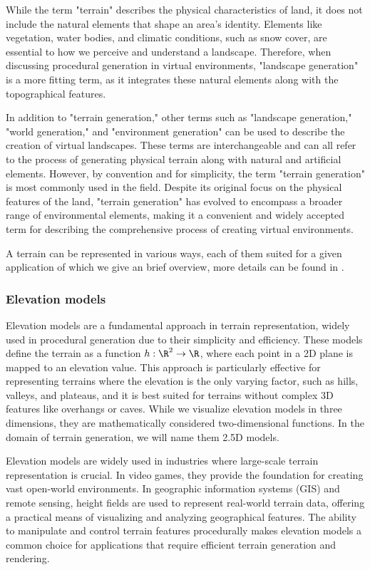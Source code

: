 While the term "terrain" describes the physical characteristics of land, it does not include the natural elements that shape an area's identity. Elements like vegetation, water bodies, and climatic conditions, such as snow cover, are essential to how we perceive and understand a landscape. Therefore, when discussing procedural generation in virtual environments, "landscape generation" is a more fitting term, as it integrates these natural elements along with the topographical features.

In addition to "terrain generation," other terms such as "landscape generation," "world generation," and "environment generation" can be used to describe the creation of virtual landscapes. These terms are interchangeable and can all refer to the process of generating physical terrain along with natural and artificial elements. However, by convention and for simplicity, the term "terrain generation" is most commonly used in the field. Despite its original focus on the physical features of the land, "terrain generation" has evolved to encompass a broader range of environmental elements, making it a convenient and widely accepted term for describing the comprehensive process of creating virtual environments.

A terrain can be represented in various ways, each of them suited for a given application of which we give an brief overview, more details can be found in \cite{Galin2019}.

\subsubsection{Elevation models}

Elevation models are a fundamental approach in terrain representation, widely used in procedural generation due to their simplicity and efficiency. These models define the terrain as a function $h : \R^2 \to \R$, where each point in a 2D plane is mapped to an elevation value. This approach is particularly effective for representing terrains where the elevation is the only varying factor, such as hills, valleys, and plateaus, and it is best suited for terrains without complex 3D features like overhangs or caves. While we visualize elevation models in three dimensions, they are mathematically considered two-dimensional functions. In the domain of terrain generation, we will name them 2.5D models.

Elevation models are widely used in industries where large-scale terrain representation is crucial. In video games, they provide the foundation for creating vast open-world environments. In geographic information systems (GIS) and remote sensing, height fields are used to represent real-world terrain data, offering a practical means of visualizing and analyzing geographical features. The ability to manipulate and control terrain features procedurally makes elevation models a common choice for applications that require efficient terrain generation and rendering.

